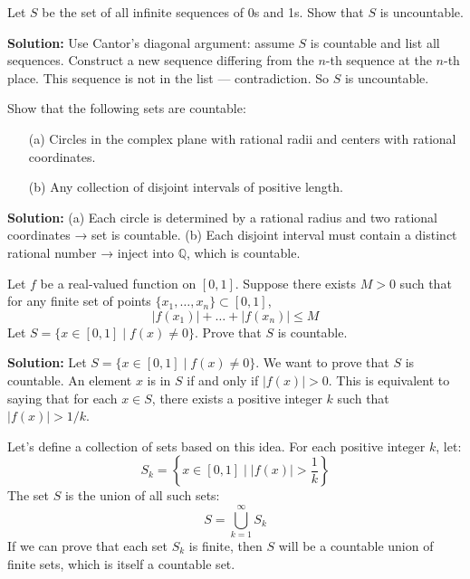 \begin{problembox}
Let \( S \) be the set of all infinite sequences of 0s and 1s. Show that \( S \) is uncountable.
\end{problembox}

\textbf{Solution:}  
Use Cantor's diagonal argument: assume \( S \) is countable and list all sequences.  
Construct a new sequence differing from the \( n \)-th sequence at the \( n \)-th place.  
This sequence is not in the list — contradiction. So \( S \) is uncountable.

\begin{problembox}
Show that the following sets are countable:
\begin{itemize}
\item[(a)] Circles in the complex plane with rational radii and centers with rational coordinates.
\item[(b)] Any collection of disjoint intervals of positive length.
\end{itemize}
\end{problembox}

\textbf{Solution:}  
(a) Each circle is determined by a rational radius and two rational coordinates → set is countable.  
(b) Each disjoint interval must contain a distinct rational number → inject into \( \mathbb{Q} \), which is countable.

\begin{problembox}
Let \( f \) be a real-valued function on \( [0,1] \). Suppose there exists \( M > 0 \) such that for any finite set of points \( \{x_1, \dots, x_n\} \subset [0,1] \),  
\[
|f(x_1)| + \dots + |f(x_n)| \le M
\]  
Let \( S = \{x \in [0,1] \mid f(x) \ne 0\} \). Prove that \( S \) is countable.
\end{problembox}

\textbf{Solution:}  
Let $S = \{x \in [0,1] \mid f(x) \ne 0\}$. We want to prove that $S$ is countable.
An element $x$ is in $S$ if and only if $|f(x)| > 0$.
This is equivalent to saying that for each $x \in S$, there exists a positive integer $k$ such that $|f(x)| > 1/k$.

Let's define a collection of sets based on this idea. For each positive integer $k$, let:
\[ S_k = \left\{ x \in [0,1] \mid |f(x)| > \frac{1}{k} \right\} \]
The set $S$ is the union of all such sets:
\[ S = \bigcup_{k=1}^{\infty} S_k \]
If we can prove that each set $S_k$ is finite, then $S$ will be a countable union of finite sets, which is itself a countable set.


